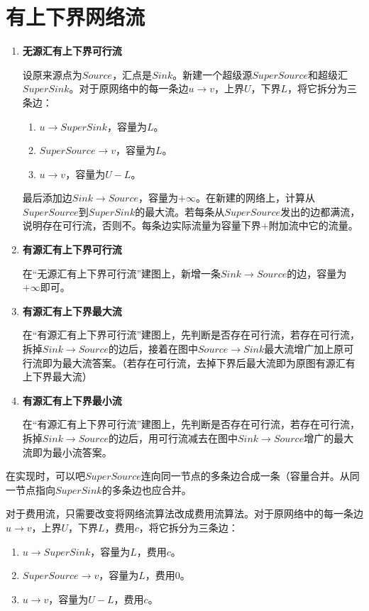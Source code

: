 \documentclass[11pt]{article}
\begin{document}
	\section{有上下界网络流}
		\begin{enumerate}[1.]
			\item \textbf{无源汇有上下界可行流}
			
			设原来源点为$Source$，汇点是$Sink$。新建一个超级源$SuperSource$和超级汇$SuperSink$。对于原网络中的每一条边$u \rightarrow v$，上界$U$，下界$L$，将它拆分为三条边：
			\begin{enumerate}[(1)]
				\item $u \rightarrow SuperSink$，容量为$L$。
				\item $SuperSource \rightarrow v$，容量为$L$。
				\item $u \rightarrow v$，容量为$U-L$。
			\end{enumerate}
			最后添加边$Sink \rightarrow Source$，容量为$+\infty$。在新建的网络上，计算从$SuperSource$到$SuperSink$的最大流。若每条从$SuperSource$发出的边都满流，说明存在可行流，否则不。每条边实际流量为容量下界$+$附加流中它的流量。
			\item \textbf{有源汇有上下界可行流}
			
			在``无源汇有上下界可行流''建图上，新增一条$Sink \rightarrow Source$的边，容量为$+\infty$即可。
			\item \textbf{有源汇有上下界最大流}
			
			在``有源汇有上下界可行流''建图上，先判断是否存在可行流，若存在可行流，拆掉$Sink \rightarrow Source$的边后，接着在图中$Source \rightarrow Sink$最大流增广加上原可行流即为最大流答案。（若存在可行流，去掉下界后最大流即为原图有源汇有上下界最大流）
			\item \textbf{有源汇有上下界最小流}
			
			在``有源汇有上下界可行流''建图上，先判断是否存在可行流，若存在可行流，拆掉$Sink \rightarrow Source$的边后，用可行流减去在图中$Sink \rightarrow Source$增广的最大流即为最小流答案。
		\end{enumerate}
		在实现时，可以吧$SuperSource$连向同一节点的多条边合成一条（容量合并。从同一节点指向$SuperSink$的多条边也应合并。
		
		对于费用流，只需要改变将网络流算法改成费用流算法。对于原网络中的每一条边$u \rightarrow v$，上界$U$，下界$L$，费用$c$，将它拆分为三条边：
		\begin{enumerate}[(1)]
			\item $u \rightarrow SuperSink$，容量为$L$，费用$c$。
			\item $SuperSource \rightarrow v$，容量为$L$，费用$0$。
			\item $u \rightarrow v$，容量为$U-L$，费用$c$。
		\end{enumerate}
\end{document}
